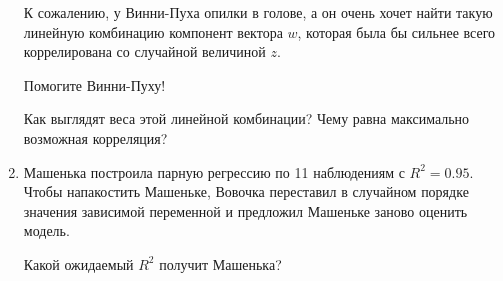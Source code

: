 \begin{enumerate}
   К сожалению, у Винни-Пуха опилки в голове, а он очень хочет найти такую линейную комбинацию
   компонент вектора $w$, которая была бы сильнее всего коррелирована со случайной
   величиной $z$.

   Помогите Винни-Пуху!

   Как выглядят веса этой линейной комбинации?
   Чему равна максимально возможная корреляция?

 \item Машенька построила парную регрессию по 11 наблюдениям с $R^2=
0.95$. Чтобы напакостить Машеньке, Вовочка переставил в случайном
порядке значения зависимой переменной и предложил Машеньке заново оценить модель.

Какой ожидаемый $R^2$ получит Машенька?
\end{enumerate}


